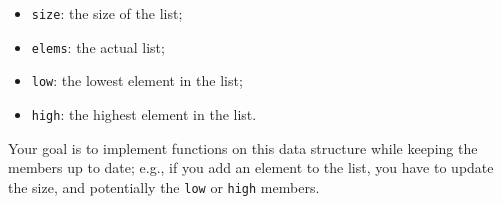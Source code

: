 \documentclass[12pt,]{tufte-handout}
\providecommand{\tightlist}{%
  \setlength{\itemsep}{0pt}\setlength{\parskip}{0pt}}
\begin{document}
\begin{itemize}
\tightlist
\item
  \texttt{size}: the size of the list;
\item
  \texttt{elems}: the actual list;
\item
  \texttt{low}: the lowest element in the list;
\item
  \texttt{high}: the highest element in the list.
\end{itemize}

Your goal is to implement functions on this data structure while keeping
the members up to date; e.g., if you add an element to the list, you
have to update the size, and potentially the \texttt{low} or
\texttt{high} members.
\end{document}

